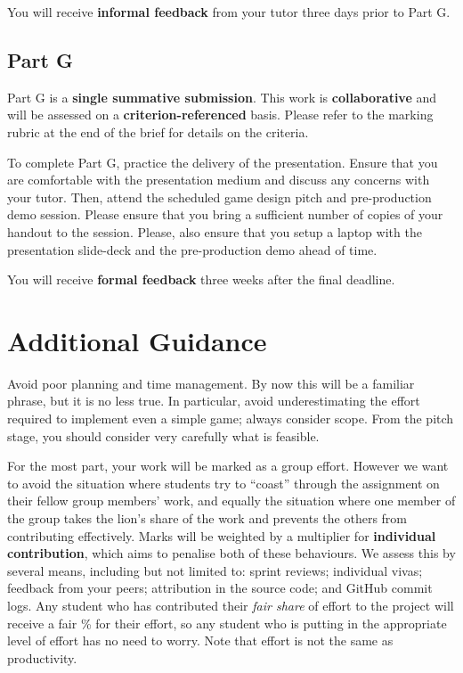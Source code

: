 \documentclass{../../fal_assignment}
\begin{document}
You will receive \textbf{informal feedback} from your tutor three days prior to Part G.

\subsection*{Part G}

Part G is a \textbf{single summative submission}. This work is \textbf{collaborative} and will be assessed on a \textbf{criterion-referenced} basis. Please refer to the marking rubric at the end of the brief for details on the criteria.

To complete Part G, practice the delivery of the presentation. Ensure that you are comfortable with the presentation medium and discuss any concerns with your tutor. Then, attend the scheduled game design pitch and pre-production demo session. Please ensure that you bring a sufficient number of copies of your handout to the session. Please, also ensure that you setup a laptop with the presentation slide-deck and the pre-production demo ahead of time.

You will receive \textbf{formal feedback} three weeks after the final deadline.

\section*{Additional Guidance}

Avoid poor planning and time management. By now this will be a familiar phrase, but it is no less true.
In particular, avoid underestimating the effort required to implement even a simple game; always consider scope.
From the pitch stage, you should consider very carefully what is feasible.

For the most part, your work will be marked as a group effort.
However we want to avoid the situation where students try to ``coast'' through the assignment
on their fellow group members' work,
and equally the situation where one member of the group takes the lion's share of the work
and prevents the others from contributing effectively.
Marks will be weighted by a multiplier for \textbf{individual contribution},
which aims to penalise both of these behaviours.
We assess this by several means, including but not limited to: sprint reviews; individual vivas; feedback from your peers;
attribution in the source code; and GitHub commit logs.
Any student who has contributed their \textit{fair share} of effort to the project will receive a fair \% for their effort,
so any student who is putting in the appropriate level of effort has no need to worry.
Note that effort is not the same as productivity.
\end{document}
